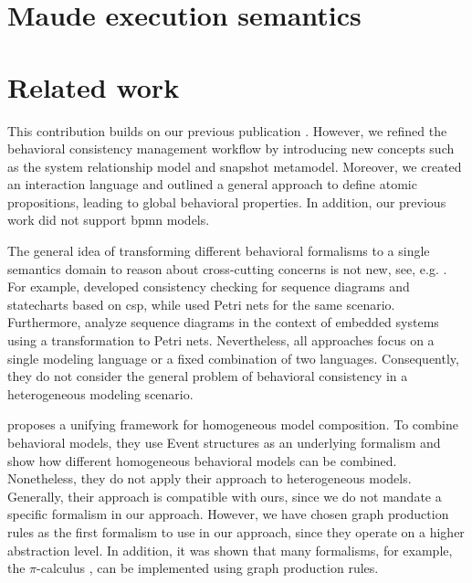 \documentclass{jot}
\begin{document}
\section{Maude execution semantics} \label{sec:maude_execution_semantics}


\section{Related work} \label{sec:related_work}
This contribution builds on our previous publication \cite{krauterBehavioralConsistencyHeterogeneous2021}.
However, we refined the behavioral consistency management workflow by introducing new concepts such as the system relationship model and snapshot metamodel.
Moreover, we created an interaction language and outlined a general approach to define atomic propositions, leading to global behavioral properties.
In addition, our previous work did not support \gls*{bpmn} models.

The general idea of transforming different behavioral formalisms to a single semantics domain to reason about cross-cutting concerns is not new, see, e.g. \cite{engelsMethodologySpecifyingAnalyzing2001}.
For example, \cite{kusterExplicitBehavioralConsistency2003} developed consistency checking for sequence diagrams and statecharts based on \gls*{csp}, while \cite{yaoConsistencyCheckingUML2006} used Petri nets for the same scenario.
Furthermore, \cite{cunhaFormalVerificationUML2011} analyze sequence diagrams in the context of embedded systems using a transformation to Petri nets.
Nevertheless, all approaches focus on a single modeling language or a fixed combination of two languages.
Consequently, they do not consider the general problem of behavioral consistency in a heterogeneous modeling scenario.

\cite{kienzleUnifyingFrameworkHomogeneous2019} proposes a unifying framework for homogeneous model composition.
To combine behavioral models, they use Event structures \cite{winskelEventStructures1987} as an underlying formalism and show how different homogeneous behavioral models can be combined.
Nonetheless, they do not apply their approach to heterogeneous models.
Generally, their approach is compatible with ours, since we do not mandate a specific formalism in our approach.
However, we have chosen graph production rules as the first formalism to use in our approach, since they operate on a higher abstraction level.
In addition, it was shown that many formalisms, for example, the $\pi$-calculus \cite{gadducciGraphRewritingPcalculus2007}, can be implemented using graph production rules.
\end{document}
